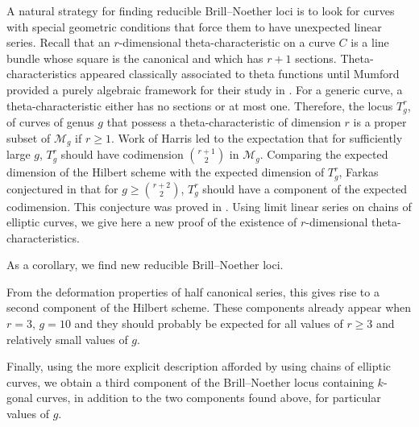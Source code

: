 \documentclass[11pt]{amsart}
\newcommand{\BN}[3]{\mathcal{M}^{#2}_{#1,#3}}
\theoremstyle{definition}
\theoremstyle{definition}
\newtheorem{theoremintro}{Theorem}
\begin{document}
A natural strategy for finding reducible Brill--Noether loci is to look for curves with special geometric conditions that force them to have unexpected linear series.
Recall that an {$r$-dimensional} theta-characteristic on a curve $C$ is a line bundle whose square is the canonical and which has $r+1$ sections.
Theta-characteristics appeared classically associated to theta functions until Mumford provided a purely algebraic framework for their study in \cite{MTheta}.
For a generic curve, a theta-characteristic either has no sections or at most one. 
Therefore, the locus $T^r_g$, of curves of genus $g$ that possess a theta-characteristic of dimension $r$ is a proper subset of ${\mathcal M}_g$ if $r\ge 1$.
Work of Harris \cite{HTheta} led to the expectation that for sufficiently large $g$, $T^r_g$ should have codimension ${r+1 \choose 2}$ in ${\mathcal M}_g$.
Comparing the expected  dimension of the Hilbert scheme with the expected dimension of $T^r_g$, Farkas conjectured in \cite{F} that for $g\geq {r+2 \choose 2}$, $T^r_g$ should have a component of the expected codimension.
This conjecture was proved in \cite{Benzo}. Using limit linear series on chains of elliptic curves, we give here a new proof of the existence of $r$-dimensional theta-characteristics.
As a corollary, we find new reducible Brill--Noether loci.
    From the deformation properties of half canonical series, this gives rise to a second component of the Hilbert scheme.
  These components already appear when $r=3$, $g=10$ and they should probably be expected for all values of $r\ge 3$ and relatively small values of $g$.

  Finally, using the more explicit description afforded by using chains of elliptic curves, we obtain a third component of the Brill--Noether locus containing $k$-gonal curves, in addition to the two components found above, for particular values of $g$.
   
\end{document}
